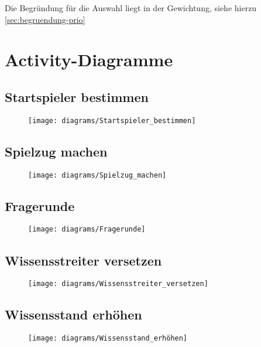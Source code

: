 Die Begründung für die Auswahl liegt in der Gewichtung, siehe hierzu \ref{sec:begruendung-prio}

\newpage
\section{Activity-Diagramme}
\subsection{Startspieler bestimmen}
\begin{figure}[h]
  \begin{center}
    \texttt{[image: diagrams/Startspieler\_bestimmen]}
  \end{center}
\end{figure}

\newpage
\subsection{Spielzug machen}
\begin{figure}[h]
  \begin{center}
    \texttt{[image: diagrams/Spielzug\_machen]}
  \end{center}
\end{figure}

\newpage
\subsection{Fragerunde}
\begin{figure}[h]
  \begin{center}
    \texttt{[image: diagrams/Fragerunde]}
  \end{center}
\end{figure}

\newpage
\subsection{Wissensstreiter versetzen}
\begin{figure}[h]
  \begin{center}
    \texttt{[image: diagrams/Wissensstreiter\_versetzen]}
  \end{center}
\end{figure}

\newpage
\subsection{Wissensstand erhöhen}
\begin{figure}[h]
  \begin{center}
    \texttt{[image: diagrams/Wissensstand\_erhöhen]}
  \end{center}
\end{figure}

